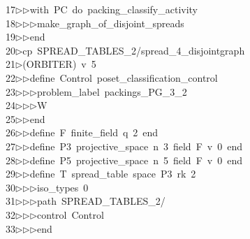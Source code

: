 \begin{tabbing}
17\>$\triangleright$\>$\triangleright$\>with\ PC\ do\ packing\_classify\_activity\ \\[0pt]
18\>$\triangleright$\>$\triangleright$\>$\triangleright$\>make\_graph\_of\_disjoint\_spreads\ \\[0pt]
19\>$\triangleright$\>$\triangleright$\>end\\[0pt]
20\>$\triangleright$\>cp\ SPREAD\_TABLES\_2/spread\_4\_disjointgraph\ \\[0pt]
21\>$\triangleright$\>(ORBITER)\ v\ 5\ \\[0pt]
22\>$\triangleright$\>$\triangleright$\>define\ Control\ poset\_classification\_control\ \\[0pt]
23\>$\triangleright$\>$\triangleright$\>$\triangleright$\>problem\_label\ packings\_PG\_3\_2\ \\[0pt]
24\>$\triangleright$\>$\triangleright$\>$\triangleright$\>W\ \\[0pt]
25\>$\triangleright$\>$\triangleright$\>end\ \\[0pt]
26\>$\triangleright$\>$\triangleright$\>define\ F\ finite\_field\ q\ 2\ end\ \\[0pt]
27\>$\triangleright$\>$\triangleright$\>define\ P3\ projective\_space\ n\ 3\ field\ F\ v\ 0\ end\ \\[0pt]
28\>$\triangleright$\>$\triangleright$\>define\ P5\ projective\_space\ n\ 5\ field\ F\ v\ 0\ end\ \\[0pt]
29\>$\triangleright$\>$\triangleright$\>define\ T\ spread\_table\ space\ P3\ rk\ 2\ \\[0pt]
30\>$\triangleright$\>$\triangleright$\>$\triangleright$\>iso\_types\ 0\ \\[0pt]
31\>$\triangleright$\>$\triangleright$\>$\triangleright$\>path\ SPREAD\_TABLES\_2/\ \\[0pt]
32\>$\triangleright$\>$\triangleright$\>$\triangleright$\>control\ Control\ \\[0pt]
33\>$\triangleright$\>$\triangleright$\>$\triangleright$\>end\ \\[0pt]

\end{tabbing}
